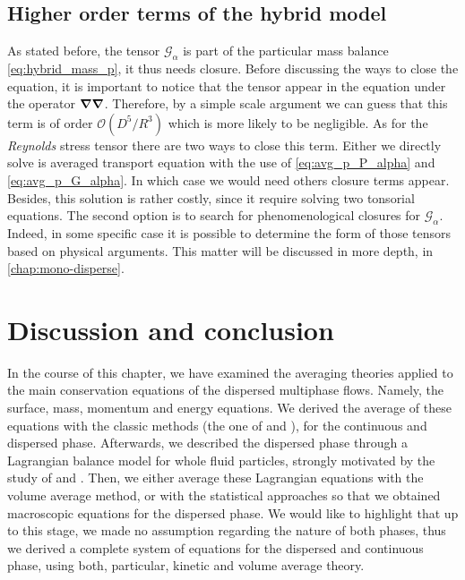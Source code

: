 \subsection{Higher order terms of the hybrid model}

As stated before, the tensor $\mathcal{G}_\alpha$ is part of the particular mass balance \ref{eq:hybrid_mass_p}, it thus needs closure. 
Before discussing the ways to close the equation, it is important to notice that the tensor appear in the equation under the operator $\bm{\nabla} \bm{\nabla}$. 
Therefore, by a simple scale argument we can guess that this term is of order $\mathcal{O}(D^5 / R^3)$ which is more likely to be negligible. 
As for the \textit{Reynolds} stress tensor there are two ways to close this term. 
Either we directly solve is averaged transport equation with the use of \ref{eq:avg_p_P_alpha} and \ref{eq:avg_p_G_alpha}.
In which case we would need others closure terms appear. 
Besides, this solution is rather costly, since it require solving two tonsorial equations. 
The second option is to search for phenomenological closures for $\mathcal{G}_\alpha$. 
Indeed, in some specific case it is possible to determine the form of those tensors based on physical arguments. 
This matter will be discussed in more depth, in \ref{chap:mono-disperse}.



\section{Discussion and conclusion}

In the course of this chapter, we have examined the averaging theories applied to the main conservation equations of the dispersed multiphase flows. 
Namely, the surface, mass, momentum and energy equations. 
We derived the average of these equations with the classic methods (the one of \citet{drew1983mathematical} and \citet{kataoka1986local}), for the continuous  and dispersed phase. 
Afterwards, we described the dispersed phase through a Lagrangian balance model for whole fluid particles, strongly motivated by the study of \cite{morel2015mathematical} and \citet{zaepffel2011modelisation}. 
Then, we either average these Lagrangian equations with the volume average method, or with the statistical approaches so that we obtained macroscopic equations for the dispersed phase. 
We would like to highlight that up to this stage, we made no assumption regarding the nature of both phases, thus we derived a complete system of equations for the dispersed and continuous phase, using both, particular, kinetic and volume average theory.


